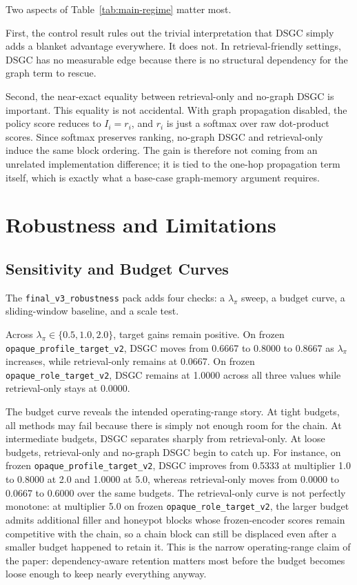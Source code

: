\documentclass[10pt]{article}
\begin{document}
Two aspects of Table~\ref{tab:main-regime} matter most.

First, the control result rules out the trivial interpretation that DSGC simply adds a blanket advantage everywhere. It does not. In retrieval-friendly settings, DSGC has no measurable edge because there is no structural dependency for the graph term to rescue.

Second, the near-exact equality between retrieval-only and no-graph DSGC is important. This equality is not accidental. With graph propagation disabled, the policy score reduces to $I_i=r_i$, and $r_i$ is just a softmax over raw dot-product scores. Since softmax preserves ranking, no-graph DSGC and retrieval-only induce the same block ordering. The gain is therefore not coming from an unrelated implementation difference; it is tied to the one-hop propagation term itself, which is exactly what a base-case graph-memory argument requires.

\FloatBarrier

\section{Robustness and Limitations}

\subsection{Sensitivity and Budget Curves}

The \texttt{final\_v3\_robustness} pack adds four checks: a $\lambda_\pi$ sweep, a budget curve, a sliding-window baseline, and a scale test.

Across $\lambda_\pi \in \{0.5,1.0,2.0\}$, target gains remain positive. On frozen \texttt{opaque\_profile\_target\_v2}, DSGC moves from 0.6667 to 0.8000 to 0.8667 as $\lambda_\pi$ increases, while retrieval-only remains at 0.0667. On frozen \texttt{opaque\_role\_target\_v2}, DSGC remains at 1.0000 across all three values while retrieval-only stays at 0.0000.

The budget curve reveals the intended operating-range story. At tight budgets, all methods may fail because there is simply not enough room for the chain. At intermediate budgets, DSGC separates sharply from retrieval-only. At loose budgets, retrieval-only and no-graph DSGC begin to catch up. For instance, on frozen \texttt{opaque\_profile\_target\_v2}, DSGC improves from 0.5333 at multiplier 1.0 to 0.8000 at 2.0 and 1.0000 at 5.0, whereas retrieval-only moves from 0.0000 to 0.0667 to 0.6000 over the same budgets. The retrieval-only curve is not perfectly monotone: at multiplier 5.0 on frozen \texttt{opaque\_role\_target\_v2}, the larger budget admits additional filler and honeypot blocks whose frozen-encoder scores remain competitive with the chain, so a chain block can still be displaced even after a smaller budget happened to retain it. This is the narrow operating-range claim of the paper: dependency-aware retention matters most before the budget becomes loose enough to keep nearly everything anyway.
\end{document}
